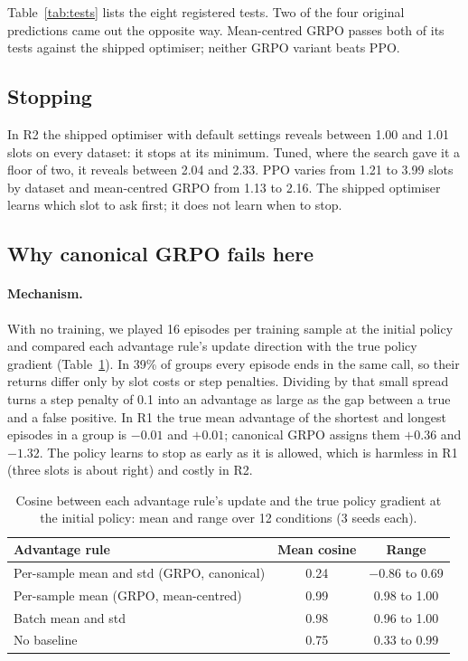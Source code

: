 \documentclass[11pt,a4paper]{article}
\begin{document}
Table~\ref{tab:tests} lists the eight registered tests. Two of the four original predictions came out the
opposite way. Mean-centred GRPO passes both of its tests against the shipped optimiser; neither GRPO variant
beats PPO.

\subsection{Stopping}

In R2 the shipped optimiser with default settings reveals between 1.00 and 1.01 slots on every dataset: it stops
at its minimum. Tuned, where the search gave it a floor of two, it reveals between 2.04 and 2.33. PPO varies from
1.21 to 3.99 slots by dataset and mean-centred GRPO from 1.13 to 2.16. The shipped optimiser learns which slot
to ask first; it does not learn when to stop.

\subsection{Why canonical GRPO fails here}

\paragraph{Mechanism.} With no training, we played 16 episodes per training sample at the initial policy and
compared each advantage rule's update direction with the true policy gradient (Table~\ref{tab:cos}). In 39\% of
groups every episode ends in the same call, so their returns differ only by slot costs or step penalties.
Dividing by that small spread turns a step penalty of 0.1 into an advantage as large as the gap between a true
and a false positive. In R1 the true mean advantage of the shortest and longest episodes in a group is $-0.01$
and $+0.01$; canonical GRPO assigns them $+0.36$ and $-1.32$. The policy learns to stop as early as it is
allowed, which is harmless in R1 (three slots is about right) and costly in R2.

\begin{table}[t]
\centering\small
\begin{tabular}{lcc}
\toprule
Advantage rule & Mean cosine & Range \\
\midrule
Per-sample mean and std (GRPO, canonical) & 0.24 & $-0.86$ to 0.69 \\
Per-sample mean (GRPO, mean-centred) & 0.99 & 0.98 to 1.00 \\
Batch mean and std & 0.98 & 0.96 to 1.00 \\
No baseline & 0.75 & 0.33 to 0.99 \\
\bottomrule
\end{tabular}
\caption{Cosine between each advantage rule's update and the true policy gradient at the initial policy: mean
and range over 12 conditions (3 seeds each).}
\label{tab:cos}
\end{table}
\end{document}
